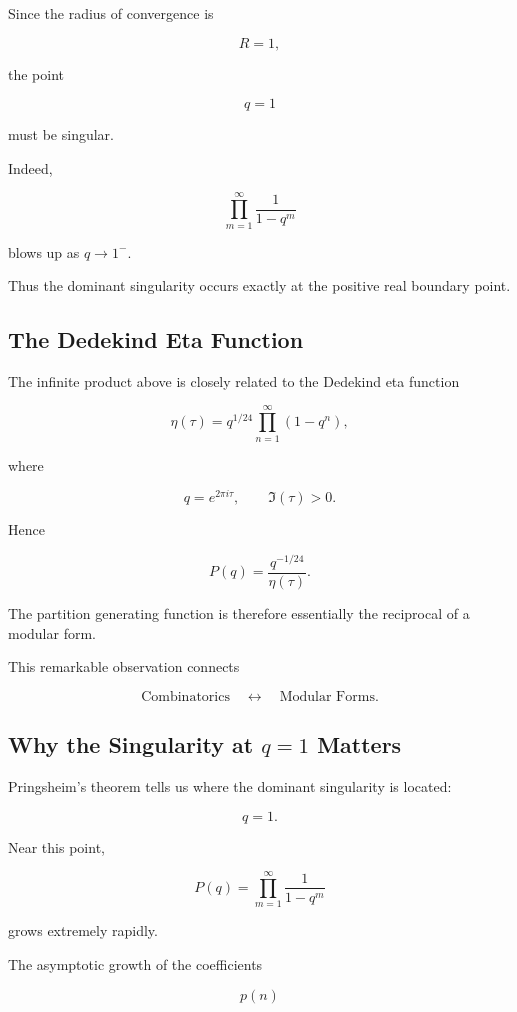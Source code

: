 \documentclass[12pt,a4paper]{article}
\theoremstyle{notespace}
\begin{document}
\bigskip

Since the radius of convergence is

\[
R=1,
\]

the point

\[
q=1
\]

must be singular.

Indeed,

\[
\prod_{m=1}^{\infty}
\frac{1}{1-q^m}
\]

blows up as \(q\to1^{-}\).

Thus the dominant singularity occurs exactly at the positive real boundary point.

\bigskip

\subsection{The Dedekind Eta Function}

The infinite product above is closely related to the Dedekind eta function

\[
\eta(\tau)
=
q^{1/24}
\prod_{n=1}^{\infty}
(1-q^n),
\]

where

\[
q=e^{2\pi i\tau},
\qquad
\Im(\tau)>0.
\]

Hence

\[
P(q)
=
\frac{q^{-1/24}}{\eta(\tau)}.
\]

The partition generating function is therefore essentially the reciprocal of a modular form.

\bigskip

This remarkable observation connects

\[
\text{Combinatorics}
\quad\longleftrightarrow\quad
\text{Modular Forms}.
\]

\bigskip

\subsection{Why the Singularity at \(q=1\) Matters}

Pringsheim's theorem tells us where the dominant singularity is located:

\[
q=1.
\]

Near this point,

\[
P(q)
=
\prod_{m=1}^{\infty}
\frac1{1-q^m}
\]

grows extremely rapidly.

The asymptotic growth of the coefficients

\[
p(n)
\]
\end{document}
